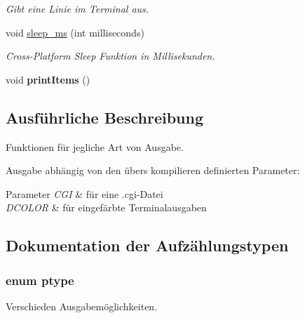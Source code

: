 \begin{DoxyCompactItemize}
\begin{DoxyCompactList}\small\item\em Gibt eine Linie im Terminal aus. \end{DoxyCompactList}\item 
void \hyperlink{group___lend_lib_out_ga73a8d7e98be85f67961ca682c291033a}{sleep\+\_\+ms} (int milliseconds)
\begin{DoxyCompactList}\small\item\em Cross-\/\+Platform Sleep Funktion in Millisekunden. \end{DoxyCompactList}\item 
void {\bfseries print\+Items} ()\hypertarget{group___lend_lib_out_ga83cb01db1bc577a2e4a54cbe62773c17}{}\label{group___lend_lib_out_ga83cb01db1bc577a2e4a54cbe62773c17}

\end{DoxyCompactItemize}


\subsection{Ausführliche Beschreibung}
Funktionen für jegliche Art von Ausgabe. 

Ausgabe abhängig von den übers kompilieren definierten Parameter\+: 
\begin{DoxyParams}{Parameter}
{\em C\+GI} & für eine .cgi-\/\+Datei \\
\hline
{\em D\+C\+O\+L\+OR} & für eingefärbte Terminalausgaben \\
\hline
\end{DoxyParams}


\subsection{Dokumentation der Aufzählungstypen}
\subsubsection[{\texorpdfstring{ptype}{ptype}}]{\setlength{\rightskip}{0pt plus 5cm}enum {\bf ptype}}\hypertarget{group___lend_lib_out_ga0916607956575302a93dbd21440edc1a}{}\label{group___lend_lib_out_ga0916607956575302a93dbd21440edc1a}


Verschieden Ausgabemöglichkeiten. 

